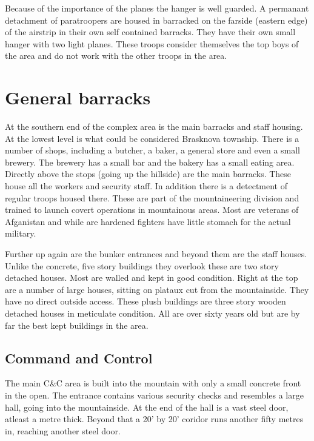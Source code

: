 \documentclass{amsart}
\begin{document}
\begin{multicols}{3}
Because of the importance of the planes the hanger is well guarded.  A
permanant detachment of paratroopers are housed in barracked on the
farside (eastern edge) of the airstrip in their own self contained
barracks.  They have their own small hanger with two light planes.
These troops consider themselves the top boys of the area and do not
work with the other troops in the area.

\section{General barracks}

At the southern end of the complex area is the main barracks and staff
housing.  At the lowest level is what could be considered Brasknova
township.  There is a number of shops, including a butcher, a baker, a
general store and even a small brewery.  The brewery has a small bar
and the bakery has a small eating area.  Directly above the stops
(going up the hillside) are the main barracks.  These house all the
workers and security staff.  In addition there is a detectment of
regular troops housed there.  These are part of the mountaineering
division and trained to launch covert operations in mountainous areas.
Most are veterans of Afganistan and while are hardened fighters have
little stomach for the actual military.

Further up again are the bunker entrances and beyond them are the
staff houses.  Unlike the concrete, five story buildings they overlook
these are two story detached houses.  Most are walled and kept in good
condition.  Right at the top are a number of large houses, sitting on
plataux cut from the mountainside.  They have no direct outside
access.  These plush buildings are three story wooden detached houses
in meticulate condition.  All are over sixty years old but are by far
the best kept buildings in the area.

\subsection{Command and Control}

The main C\&C area is built into the mountain with only a small
concrete front in the open.  The entrance contains various security
checks and resembles a large hall, going into the mountainside.  At
the end of the hall is a vast steel door, atleast a metre thick.
Beyond that a 20' by 20' coridor runs another fifty metres in,
reaching another steel door.


\end{multicols}
\end{document}
